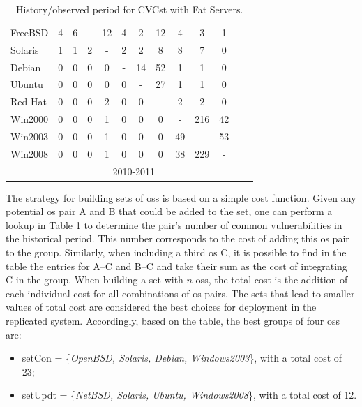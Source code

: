 \begin{table}[!ht]
\begin{center}
{\begin{tabular}{|l|c|c|c|c|c|c|c|c|c|c|c|c|}
FreeBSD & 4 & 6 & - & 12 & 4 & 2 & 12 & 4 & 3 & 1& \\ \cline{1-11}
Solaris & 1 & 1 & 2 & - & 2 & 2 & 8 & 8 & 7 & 0 &\\ \cline{1-11}
Debian & 0 & 0 & 0 & 0 & - & 14 & 52 & 1 & 1 & 0 &\\ \cline{1-11}
Ubuntu & 0 & 0 & 0 & 0 & 0 & - & 27 & 1 & 1 & 0 &\\ \cline{1-11}
Red Hat & 0 & 0 & 0 & 2 & 0 & 0 & - & 2 & 2 & 0 &\\ \cline{1-11}
Win2000 & 0 & 0 & 0 & 1 & 0 & 0 & 0 & - & 216 & 42 &\\ \cline{1-11}
Win2003 & 0 & 0 & 0 & 1 & 0 & 0 & 0 & 49 & - & 53 & \\ \cline{1-12}
Win2008 & 0 & 0 & 0 & 1 & 0 & 0 & 0 & 38 & 229 & -	& \multicolumn{1}{|c}{}  \\ \cline{1-11}
 \multicolumn{1}{c|}{}& \multicolumn{9}{|c|}{2010-2011} & \multicolumn{2}{|c}{}\\ \cline{2-10}
\end{tabular}
\caption{History/observed period for CVCst with Fat Servers.}
\label{tab:strat_i}
}
\end{center}
\end{table}


The strategy for building sets of \glspl{os} is based on a simple cost function. 
Given any potential \gls{os} pair A and B that could be added to the set, one can perform a lookup in Table \ref{tab:strat_i} to determine the pair's number of common vulnerabilities in the historical period. 
This number corresponds to the cost of adding this \gls{os} pair to the group. 
Similarly, when including a third \gls{os} C, it is possible to find in the table the entries for A--C and B--C and take their sum as the cost of integrating C in the group. 
When building a set with $n$ \glspl{os}, the total cost is the addition of each individual cost for all combinations of \gls{os} pairs.
The sets that lead to smaller values of total cost are considered the best choices for deployment in the replicated system.
Accordingly, based on the table, the best groups of four \glspl{os} are:

\begin{itemize}
  \setlength\itemsep{0em}
\item setCon = \{\emph{OpenBSD, Solaris, Debian, Windows2003}\}, with a total cost of 23;
\item setUpdt = \{\emph{NetBSD, Solaris, Ubuntu, Windows2008}\}, with a total cost of 12.%
\end{itemize}


